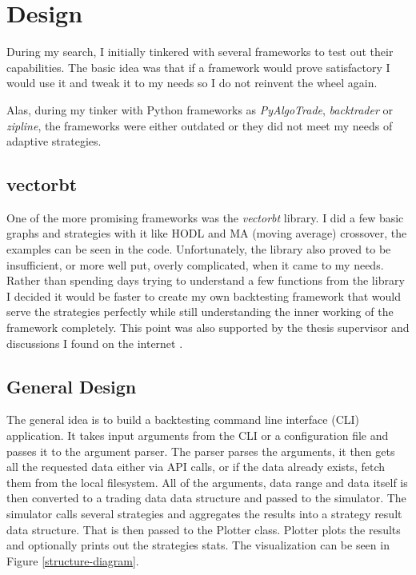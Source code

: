 \section{Design}
During my search, I initially tinkered with several frameworks to test out their capabilities. The basic idea was that if a framework would prove satisfactory I would use it and tweak it to my needs so I do not reinvent the wheel again.

Alas, during my tinker with Python frameworks as \emph{PyAlgoTrade}, \emph{backtrader} or \emph{zipline}, the frameworks were either outdated or they did not meet my needs of adaptive strategies.

\subsection*{vectorbt}
One of the more promising frameworks was the \emph{vectorbt} library. I did a few basic graphs and strategies with it like HODL and MA (moving average) crossover, the examples can be seen in the code. Unfortunately, the library also proved to be insufficient, or more well put, overly complicated, when it came to my needs. Rather than spending days trying to understand a few functions from the library I decided it would be faster to create my own backtesting framework that would serve the strategies perfectly while still understanding the inner working of the framework completely. This point was also supported by the thesis supervisor and discussions I found on the internet \cite{reddit:custom-backtester}.

\subsection*{General Design}
The general idea is to build a backtesting command line interface (CLI) application. It takes input arguments from the CLI or a configuration file and passes it to the argument parser. The parser parses the arguments, it then gets all the requested data either via API calls, or if the data already exists, fetch them from the local filesystem. All of the arguments, data range and data itself is then converted to a trading data data structure and passed to the simulator. The simulator calls several strategies and aggregates the results into a strategy result data structure. That is then passed to the Plotter class. Plotter plots the results and optionally prints out the strategies stats. The visualization can be seen in Figure \ref{structure-diagram}.

